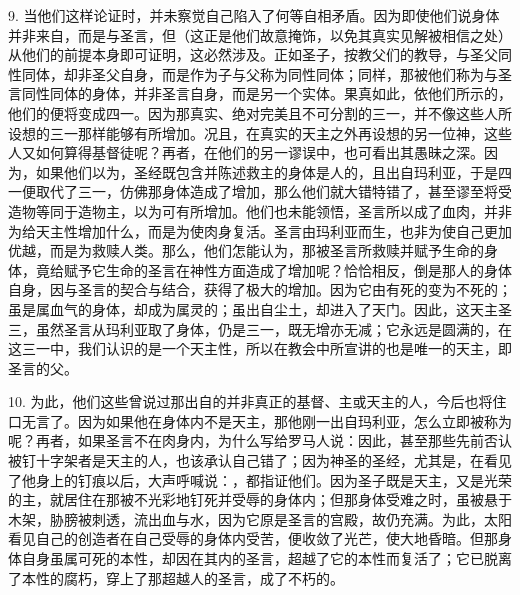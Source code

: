 9. 当他们这样论证时，并未察觉自己陷入了何等自相矛盾。因为即使他们说身体并非来自，而是与圣言，但（这正是他们故意掩饰，以免其真实见解被相信之处）从他们的前提本身即可证明，这必然涉及。正如圣子，按教父们的教导，与圣父同性同体，却非圣父自身，而是作为子与父称为同性同体；同样，那被他们称为与圣言同性同体的身体，并非圣言自身，而是另一个实体。果真如此，依他们所示的，他们的便将变成四一。因为那真实、绝对完美且不可分割的三一，并不像这些人所设想的三一那样能够有所增加。况且，在真实的天主之外再设想的另一位神，这些人又如何算得基督徒呢？再者，在他们的另一谬误中，也可看出其愚昧之深。因为，如果他们以为，圣经既包含并陈述救主的身体是人的，且出自玛利亚，于是四一便取代了三一，仿佛那身体造成了增加，那么他们就大错特错了，甚至谬至将受造物等同于造物主，以为可有所增加。他们也未能领悟，圣言所以成了血肉，并非为给天主性增加什么，而是为使肉身复活。圣言由玛利亚而生，也非为使自己更加优越，而是为救赎人类。那么，他们怎能认为，那被圣言所救赎并赋予生命的身体，竟给赋予它生命的圣言在神性方面造成了增加呢？恰恰相反，倒是那人的身体自身，因与圣言的契合与结合，获得了极大的增加。因为它由有死的变为不死的；虽是属血气的身体，却成为属灵的；虽出自尘土，却进入了天门。因此，这天主圣三，虽然圣言从玛利亚取了身体，仍是三一，既无增亦无减；它永远是圆满的，在这三一中，我们认识的是一个天主性，所以在教会中所宣讲的也是唯一的天主，即圣言的父。\par

10. 为此，他们这些曾说过那出自的并非真正的基督、主或天主的人，今后也将住口无言了。因为如果他在身体内不是天主，那他刚一出自玛利亚，怎么立即被称为呢？再者，如果圣言不在肉身内，为什么写给罗马人说：因此，甚至那些先前否认被钉十字架者是天主的人，也该承认自己错了；因为神圣的圣经，尤其是，在看见了他身上的钉痕以后，大声呼喊说：，都指证他们。因为圣子既是天主，又是光荣的主，就居住在那被不光彩地钉死并受辱的身体内；但那身体受难之时，虽被悬于木架，胁膀被刺透，流出血与水，因为它原是圣言的宫殿，故仍充满。为此，太阳看见自己的创造者在自己受辱的身体内受苦，便收敛了光芒，使大地昏暗。但那身体自身虽属可死的本性，却因在其内的圣言，超越了它的本性而复活了；它已脱离了本性的腐朽，穿上了那超越人的圣言，成了不朽的。\par

